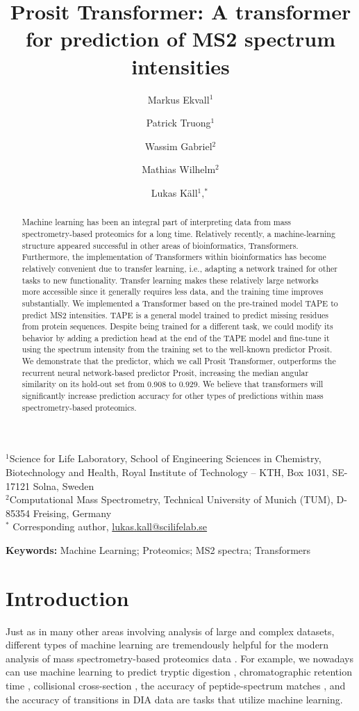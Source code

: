 \documentclass[10pt,a4paper]{article}
\title{Prosit Transformer: A transformer for prediction of MS2 spectrum intensities}
\author{Markus Ekvall$^1$ \and Patrick Truong$^1$ \and Wassim Gabriel$^2$ \and Mathias Wilhelm$^2$ \and Lukas K\"{a}ll$^1,^*$}
\date{}
\begin{document}
\maketitle
$^1$Science for Life Laboratory, School of Engineering Sciences in Chemistry, Biotechnology and Health, Royal Institute of Technology -- KTH, Box 1031, SE-17121 Solna, Sweden\\
$^2$Computational Mass Spectrometry, Technical University of Munich (TUM), D-85354 Freising, Germany\\
$^*$ Corresponding author, \url{lukas.kall@scilifelab.se}

\begin{abstract}
Machine learning has been an integral part of interpreting data from mass spectrometry-based proteomics for a long time. Relatively recently, a machine-learning structure appeared successful in other areas of bioinformatics, Transformers. Furthermore, the implementation of Transformers within bioinformatics has become relatively convenient due to transfer learning, i.e., adapting a network trained for other tasks to new functionality. Transfer learning makes these relatively large networks more accessible since it generally requires less data, and the training time improves substantially.
We implemented a Transformer based on the pre-trained model TAPE to predict MS2 intensities. TAPE is a general model trained to predict missing residues from protein sequences. Despite being trained for a different task, we could modify its behavior by adding a prediction head at the end of the TAPE model and fine-tune it using the spectrum intensity from the training set to the well-known predictor Prosit.
We demonstrate that the predictor, which we call Prosit Transformer, outperforms the recurrent neural network-based predictor Prosit, increasing the median angular similarity on its hold-out set from 0.908 to 0.929.
We believe that transformers will significantly increase prediction accuracy for other types of predictions within mass spectrometry-based proteomics.
\end{abstract}

{\bf Keywords:} Machine Learning; Proteomics; MS2 spectra; Transformers

\section*{Introduction}
Just as in many other areas involving analysis of large and complex datasets, different types of machine learning are tremendously helpful for the modern analysis of mass spectrometry-based proteomics data \cite{Meyer2021-hc,Mann2021-kx}. For example, we nowadays can use machine learning to predict tryptic digestion \cite{Yang2021-ng}, chromatographic retention time \cite{Moruz2010-ls,Ma2018-wy,Martens_undated-vs}, collisional cross-section \cite{Meier2021-ur}, the accuracy of peptide-spectrum matches \cite{Kall2007-ll}, and the accuracy of transitions in DIA data \cite{Demichev2020-zd} are tasks that utilize machine learning.
\end{document}
